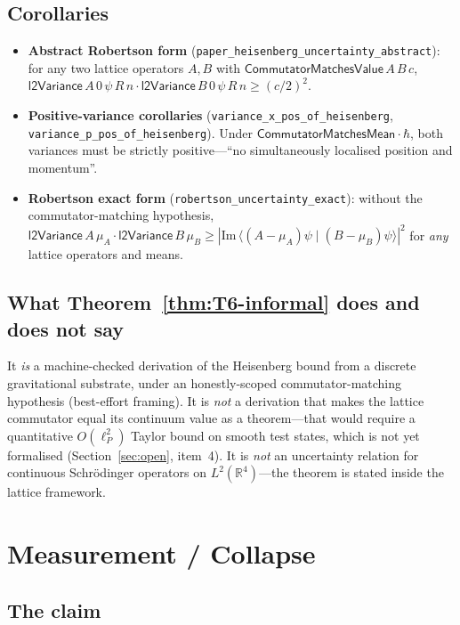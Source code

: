 \documentclass[11pt,a4paper,twoside]{article}
\theoremstyle{definition}
\newcommand{\Rbb}{\mathbb{R}}
\newcommand{\lP}{\ell_P}
\newcommand{\CMM}{\mathsf{CommutatorMatchesMean}}
\newcommand{\code}[1]{\texttt{#1}}
\begin{document}
\subsection{Corollaries}\label{sec:T6-coroll}

\begin{itemize}
\item \textbf{Abstract Robertson form}
  (\code{paper\_heisenberg\_uncertainty\_abstract}): for any two
  lattice operators $A,B$ with $\mathsf{CommutatorMatchesValue}\,A\,B\,c$,
  $\mathsf{l2Variance}\,A\,0\,\psi\,R\,n\cdot\mathsf{l2Variance}\,B\,0\,\psi\,R\,n\ge(c/2)^{2}$.
\item \textbf{Positive-variance corollaries}
  (\code{variance\_x\_pos\_of\_heisenberg},
  \code{variance\_p\_pos\_of\_heisenberg}). Under $\CMM\cdot\hbar$,
  both variances must be strictly positive---``no simultaneously
  localised position and momentum''.
\item \textbf{Robertson exact form} (\code{robertson\_uncertainty\_exact}):
  without the commutator-matching hypothesis,
  $\mathsf{l2Variance}\,A\,\mu_{A}\cdot\mathsf{l2Variance}\,B\,\mu_{B}\ge|\mathrm{Im}\,\langle(A-\mu_{A})\psi\mid(B-\mu_{B})\psi\rangle|^{2}$
  for \emph{any} lattice operators and means.
\end{itemize}

\subsection{What Theorem~\ref{thm:T6-informal} does and does not
say}\label{sec:T6-neg}

It \emph{is} a machine-checked derivation of the Heisenberg bound
from a discrete gravitational substrate, under an honestly-scoped
commutator-matching hypothesis (best-effort framing). It is
\emph{not} a derivation that makes the lattice commutator equal its
continuum value as a theorem---that would require a quantitative
$O(\lP^{2})$ Taylor bound on smooth test states, which is not yet
formalised (Section~\ref{sec:open}, item~4). It is \emph{not} an
uncertainty relation for continuous Schr\"odinger operators on
$L^{2}(\Rbb^{4})$---the theorem is stated inside the lattice
framework.

\section{Measurement / Collapse}\label{sec:measurement}

\subsection{The claim}\label{sec:measurement-claim}
\end{document}
